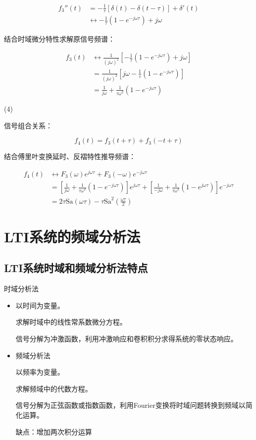 \documentclass[UTF8]{ctexart}
\begin{document}
\begin{solution}
$$
\begin{aligned}
f_{3}''(t) &= -\frac{1}{\tau}[\delta(t)-\delta(t-\tau)]+\delta'(t) \\
&\leftrightarrow -\frac{1}{\tau}\left(1-e^{-j \omega \tau}\right)+j \omega
\end{aligned}
$$

结合时域微分特性求解原信号频谱：

$$
\begin{aligned}
f_{3}(t) &\leftrightarrow \frac{1}{(j \omega)^{2}}\left[-\frac{1}{\tau}\left(1-e^{-j \omega \tau}\right)+j \omega\right] \\
&= \frac{1}{(j \omega)^{2}}\left[j \omega-\frac{1}{\tau}\left(1-e^{-j \omega \tau}\right)\right] \\
&= \frac{1}{j \omega}+\frac{1}{\tau \omega^{2}}\left(1-e^{-j \omega \tau}\right)
\end{aligned}
$$

(4)

信号组合关系：

$$
f_{4}(t)=f_{3}(t+\tau)+f_{3}(-t+\tau)
$$

结合傅里叶变换延时、反褶特性推导频谱：

$$
\begin{aligned}
f_{4}(t) &\leftrightarrow F_{3}(\omega) e^{j \omega \tau}+F_{3}(-\omega) e^{-j \omega \tau} \\
&= \left[\frac{1}{j \omega}+\frac{1}{\tau \omega^{2}}\left(1-e^{-j \omega \tau}\right)\right] e^{j \omega \tau}+\left[\frac{1}{-j \omega}+\frac{1}{\tau \omega^{2}}\left(1-e^{j \omega \tau}\right)\right] e^{-j \omega \tau} \\
&= 2 \tau \mathrm{Sa}(\omega \tau)-\tau \mathrm{Sa}^{2}\left(\frac{\omega \tau}{2}\right)
\end{aligned}
$$
\end{solution}

\section{LTI系统的频域分析法}

\subsection{LTI系统时域和频域分析法特点}

时域分析法

\begin{itemize}
    \item 以时间为变量。
    
    求解时域中的线性常系数微分方程。
    
    信号分解为冲激函数，利用冲激响应和卷积积分求得系统的零状态响应。
    
    \item 频域分析法
    
    以频率为变量。
    
    求解频域中的代数方程。
    
    信号分解为正弦函数或指数函数，利用Fourier变换将时域问题转换到频域以简化运算。
    
    缺点：增加两次积分运算
\end{itemize}
\end{document}

